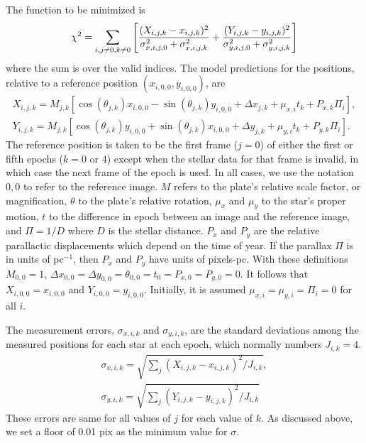 \documentclass[12pt,preprint]{aastex}
\begin{document}
The function to be minimized is
\begin{equation}
\chi^2=\sum_{i,j\ne0,k\ne0}\left [{(X_{i,j,k}-x_{i,j,k})^2
\over\sigma_{x,i,j,0}^2+\sigma_{x,i,j,k}^2} + {(Y_{i,j,k}-y_{i,j,k})^2\over\sigma_{y,i,j,0}^2+\sigma_{y,i,j,k}^2}\right ]
\end{equation}
where the sum is over the valid indices.  The model
predictions for the positions, relative to a reference position 
$(x_{i,0,0},y_{i,0,0})$, are
\begin{equation}
\begin{array}{ll}
X_{i,j,k}=M_{j,k}[\cos(\theta_{j,k})x_{i,0,0}- \sin(\theta_{j,k})y_{i,0,0}+\Delta x_{j,k}+\mu_{x,i}t_k+P_{x,k}\Pi_i], \\
Y_{i,j,k}=M_{j,k}[\cos(\theta_{j,k})y_{i,0,0}+ \sin(\theta_{j,k})x_{i,0,0}+\Delta y_{j,k}+\mu_{y,i}t_k+P_{y,k}\Pi_i]. 
\end{array}
\end{equation}
The reference position is
taken to be the first frame ($j=0$) of either the first or fifth epochs
($k=0$ or 4) except when
the stellar data for that frame is invalid, in which case the next
frame of the epoch is used. In all cases, we use the notation $0,0$ to refer
to the reference image.  $M$ refers to the plate's relative scale factor, or
magnification, $\theta$ to the plate's relative rotation, $\mu_x$ and
$\mu_y$ to the star's proper motion, $t$ to the difference in epoch
between an image and the reference image, and $\Pi=1/D$ where $D$ is the
stellar distance.  $P_x$ and $P_y$ are the relative parallactic
displacements which depend on the time of year.
If the parallax $\Pi$ is in units of pc$^{-1}$, then
$P_x$ and $P_y$ have units of pixels-pc.  With these definitions
$M_{0,0}=1$, $\Delta x_{0,0}=\Delta
y_{0,0}=\theta_{0,0}=t_0=P_{x,0}=P_{y,0}=0$.  It follows that
$X_{i,0,0}=x_{i,0,0}$ and $Y_{i,0,0}=y_{i,0,0}$.  Initially, it is
assumed $\mu_{x,i}=\mu_{y,i}=\Pi_i=0$ for all $i$.

The measurement errors, $\sigma_{x,i,k}$ and $\sigma_{y,i,k}$,
are the standard deviations among the measured
positions for each star at each epoch, which normally numbers
$J_{i,k}=4$.   %
\begin{equation}
\begin{array}{ll}
\sigma_{x,i,k}=\sqrt{\sum_j(X_{i,j,k}- x_{i,j,k})^2/J_{i,k}},\\
\sigma_{y,i,k}=\sqrt{\sum_j(Y_{i,j,k}- y_{i,j,k})^2/J_{i,k}}
\end{array}
\end{equation}
These errors are same for all values of $j$ for each value of $k$. 
As discussed above, we set a floor of 0.01 pix as the 
minimum value for $\sigma$.
\end{document}
